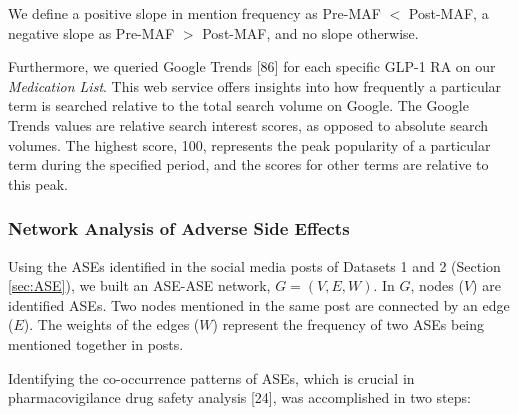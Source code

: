 \documentclass[referee,bst/sn-basic]{sn-jnl}%
\begin{document}
We define a positive slope in mention frequency as Pre-MAF $<$ Post-MAF, a negative slope as Pre-MAF $>$ Post-MAF, and no slope otherwise.

Furthermore, we queried Google Trends [86] 
for each specific GLP-1 RA on our \textit{Medication List}.
This web service offers insights into how frequently a particular term is searched relative to the total search volume on Google.
The Google Trends values are relative search interest scores, as opposed to absolute search volumes.
The highest score, 100, represents the peak popularity of a particular term during the specified period, and the scores for other terms are relative to this peak.

\subsubsection{Network Analysis of Adverse Side Effects}
\label{sec:net}
Using the ASEs identified in the social media posts of Datasets 1 and 2 (Section \ref{sec:ASE}), we built an ASE-ASE network, $G=(V,E,W)$. 
In $G$, nodes ($V$) are identified ASEs. 
Two nodes mentioned in the same post are connected by an edge ($E$). 
The weights of the edges ($W$) represent the frequency of two ASEs being mentioned together in posts.

Identifying the co-occurrence patterns of ASEs, which is crucial in pharmacovigilance drug safety analysis [24], 
was accomplished in two steps:
\end{document}

